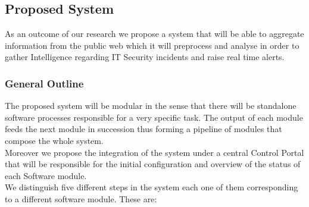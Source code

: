 \documentclass[12pt]{article}
\begin{document}
\subsection{Proposed System}
As an outcome of our research we propose a system that will be able to aggregate information from the public web which it will preprocess and analyse in order to gather Intelligence regarding IT Security incidents and raise real time alerts. 
 
\subsubsection{General Outline}
The proposed system will be modular in the sense that there will be standalone software processes responsible for a very specific task. The output of each module feeds the next module in succession thus forming a pipeline of modules that compose the whole system. \\
Moreover we propose the integration of the system under a central Control Portal that will be responsible for the initial configuration and overview of the status of each Software module.\\
We distinguish five different steps in the system each one of them corresponding to a different software module. These are:
\end{document}
